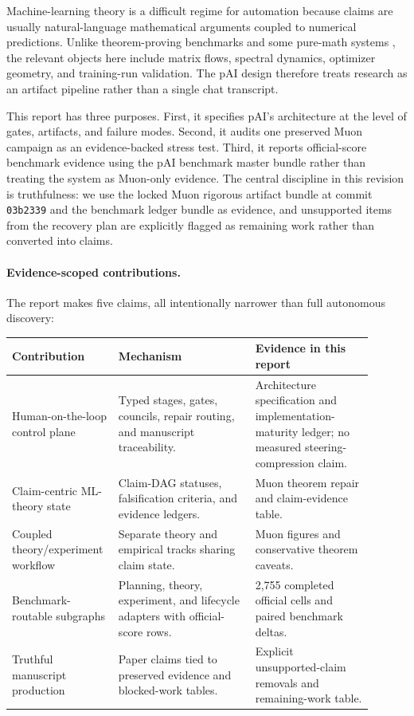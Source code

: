 \documentclass{article}
\begin{document}
Machine-learning theory is a difficult regime for automation because claims are usually natural-language mathematical arguments coupled to numerical predictions. Unlike theorem-proving benchmarks and some pure-math systems \citep{trinh2024alphageometry,romerapadres2024funsearch}, the relevant objects here include matrix flows, spectral dynamics, optimizer geometry, and training-run validation. The pAI design therefore treats research as an artifact pipeline rather than a single chat transcript.

This report has three purposes. First, it specifies pAI's architecture at the level of gates, artifacts, and failure modes. Second, it audits one preserved Muon campaign as an evidence-backed stress test. Third, it reports official-score benchmark evidence using the pAI benchmark master bundle rather than treating the system as Muon-only evidence. The central discipline in this revision is truthfulness: we use the locked Muon rigorous artifact bundle at commit \texttt{03b2339} and the benchmark ledger bundle as evidence, and unsupported items from the recovery plan are explicitly flagged as remaining work rather than converted into claims.

\paragraph{Evidence-scoped contributions.}
The report makes five claims, all intentionally narrower than full autonomous discovery:
\begin{center}
\small
\begin{tabular}{@{}p{0.23\linewidth}p{0.36\linewidth}p{0.31\linewidth}@{}}
\toprule
\textbf{Contribution} & \textbf{Mechanism} & \textbf{Evidence in this report} \\
\midrule
Human-on-the-loop control plane & Typed stages, gates, councils, repair routing, and manuscript traceability. & Architecture specification and implementation-maturity ledger; no measured steering-compression claim. \\
Claim-centric ML-theory state & Claim-DAG statuses, falsification criteria, and evidence ledgers. & Muon theorem repair and claim-evidence table. \\
Coupled theory/experiment workflow & Separate theory and empirical tracks sharing claim state. & Muon figures and conservative theorem caveats. \\
Benchmark-routable subgraphs & Planning, theory, experiment, and lifecycle adapters with official-score rows. & 2,755 completed official cells and paired benchmark deltas. \\
Truthful manuscript production & Paper claims tied to preserved evidence and blocked-work tables. & Explicit unsupported-claim removals and remaining-work table. \\
\bottomrule
\end{tabular}
\end{center}
\end{document}
